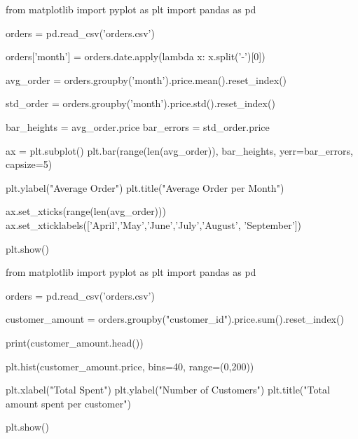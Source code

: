 \documentclass{journal}
\begin{document}
from matplotlib import pyplot as plt
import pandas as pd

orders = pd.read_csv('orders.csv')

orders['month'] = orders.date.apply(lambda x: x.split('-')[0])

avg_order = orders.groupby('month').price.mean().reset_index()

std_order = orders.groupby('month').price.std().reset_index()

bar_heights = avg_order.price
bar_errors = std_order.price


ax = plt.subplot()
plt.bar(range(len(avg_order)), bar_heights, yerr=bar_errors, capsize=5)

plt.ylabel("Average Order")
plt.title("Average Order per Month")

ax.set_xticks(range(len(avg_order)))
ax.set_xticklabels(['April','May','June','July','August', 'September'])

plt.show()











from matplotlib import pyplot as plt
import pandas as pd

orders = pd.read_csv('orders.csv')

customer_amount = orders.groupby("customer_id").price.sum().reset_index()

print(customer_amount.head())

plt.hist(customer_amount.price, bins=40, range=(0,200))

plt.xlabel("Total Spent")
plt.ylabel("Number of Customers")
plt.title("Total amount spent per customer")

plt.show()
\end{document}
